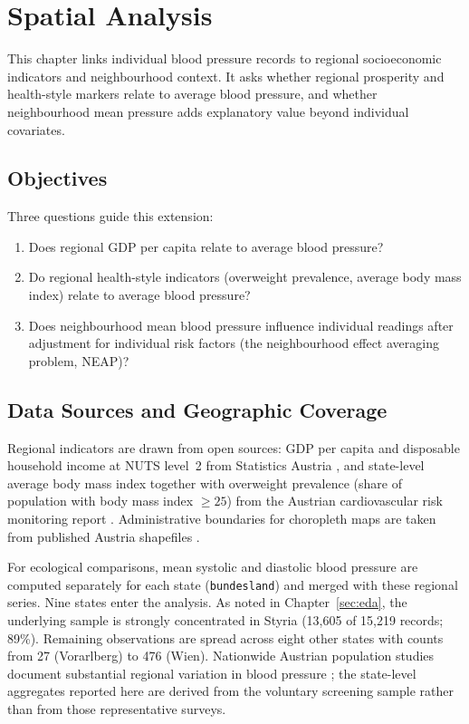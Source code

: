 \chapter{Spatial Analysis}
\label{sec:spatial_analysis}

This chapter links individual blood pressure records to regional socioeconomic indicators and neighbourhood context. It asks whether regional prosperity and health-style markers relate to average blood pressure, and whether neighbourhood mean pressure adds explanatory value beyond individual covariates.

\section{Objectives}
\label{sec:spatial_objectives}

Three questions guide this extension:
\begin{enumerate}
    \item Does regional GDP per capita relate to average blood pressure?
    \item Do regional health-style indicators (overweight prevalence, average body mass index) relate to average blood pressure?
    \item Does neighbourhood mean blood pressure influence individual readings after adjustment for individual risk factors (the neighbourhood effect averaging problem, NEAP)?
\end{enumerate}

\section{Data Sources and Geographic Coverage}
\label{sec:spatial_data}

Regional indicators are drawn from open sources: GDP per capita and disposable household income at NUTS level~2 from Statistics Austria \cite{statistik_atlas}, and state-level average body mass index together with overweight prevalence (share of population with body mass index $\geq 25$) from the Austrian cardiovascular risk monitoring report \cite{ec_health_monitoring_2002}. Administrative boundaries for choropleth maps are taken from published Austria shapefiles \cite{igismap_austria_shapefile}.

For ecological comparisons, mean systolic and diastolic blood pressure are computed separately for each state (\texttt{bundesland}) and merged with these regional series. Nine states enter the analysis. As noted in Chapter~\ref{sec:eda}, the underlying sample is strongly concentrated in Styria (13,605 of 15,219 records; 89\%). Remaining observations are spread across eight other states with counts from 27 (Vorarlberg) to 476 (Wien). Nationwide Austrian population studies document substantial regional variation in blood pressure \cite{springer_bp_austria}; the state-level aggregates reported here are derived from the voluntary screening sample rather than from those representative surveys.

